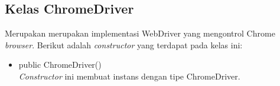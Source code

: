 

\subsection{Kelas ChromeDriver}
\label{subsec:chromedriver}
Merupakan merupakan implementasi WebDriver yang mengontrol Chrome \textit{browser}. Berikut adalah \textit{constructor} yang terdapat pada kelas ini:
\begin{itemize}
\item public ChromeDriver()\\
\textit{Constructor} ini membuat instans dengan tipe ChromeDriver.
\end{itemize}

